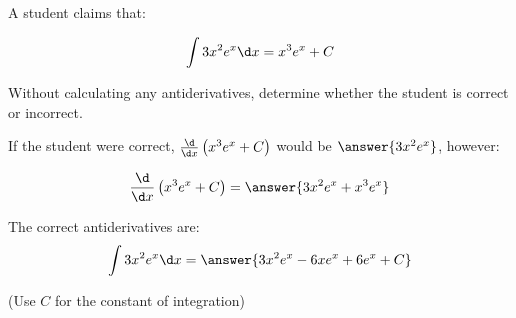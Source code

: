 \documentclass{ximera}
\author{Jim Talamo}
\begin{document}
\begin{exercise}
A student claims that:

\[
\int 3x^2 e^{x} \d x =x^3 e^{x} +C
\]

Without calculating any antiderivatives, determine whether the student is correct or incorrect. 

\begin{multipleChoice}
\end{multipleChoice}

If the student were correct, $\frac{\d}{\d x} \left(x^3 e^{x} +C\right)$ would be $\answer{3x^2 e^{x}}$, however:

\[
\frac{\d}{\d x} \left(x^3 e^{x} +C\right) = \answer{3x^2e^x+x^3e^x}
\]

\begin{exercise}
The correct antiderivatives are:
\[
\int 3x^2 e^x \d x = \answer{3x^2e^x-6xe^x+6e^x +C}
\]

(Use $C$ for the constant of integration)
\end{exercise}
\end{exercise}
\end{document}
